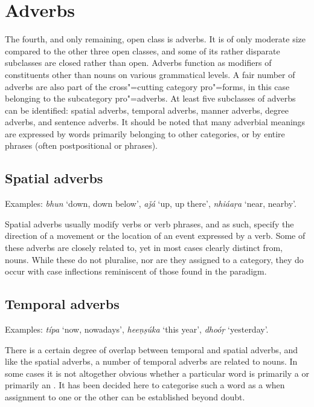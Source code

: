 \section{Adverbs}
\label{sec:3b-5}
The fourth, and only remaining, open class is adverbs. It is of only moderate size compared to the other three open classes, and some of its rather disparate subclasses are closed rather than open. Adverbs function as modifiers of constituents other than nouns on various grammatical levels. A fair number of adverbs are also part of the cross"=cutting category pro"=forms, in this case belonging to the subcategory pro"=adverbs. At least five subclasses of adverbs can be identified: spatial adverbs, temporal adverbs, manner adverbs, degree adverbs, and sentence adverbs. It should be noted that many adverbial meanings are expressed by words primarily belonging to other categories, or by entire phrases (often postpositional or  phrases).


\subsection{Spatial adverbs}
\label{subsec:3b-5-1}
Examples: \textit{bhun} `down, down below', \textit{aǰá} `up, up there', \textit{nhiáaṛa} `near, nearby'.


Spatial adverbs usually modify verbs or verb phrases, and as such, specify the direction of a movement or the location of an event expressed by a verb. Some of these adverbs are closely related to, yet in most cases clearly distinct from, nouns. While these do not pluralise, nor are they assigned to a  category, they do occur with case inflections reminiscent of those found in the  paradigm. 


\subsection{Temporal adverbs}
\label{subsec:3b-5-2}
Examples: \textit{típa} `now, nowadays', \textit{heeṇṣúka} `this year', \textit{dhoóṛ} `yesterday'.


There is a certain degree of overlap between temporal and spatial adverbs, and like the spatial adverbs, a number of temporal adverbs are related to nouns. In some cases it is not altogether obvious whether a particular word is primarily a  or primarily an . It has been decided here to categorise such a word as a  when assignment to one or the other  can be established beyond doubt.


